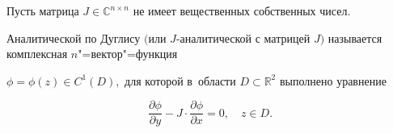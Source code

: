 \begin{definition}[1~\cite{1Nk-S1}]Пусть  матрица $J\in\mathbb{C}^{n\times n}$ не имеет вещественных собственных чисел$.$ 

Аналитической по Дуглису $($или $J$-аналитической с матрицей $J)$ называется   комплексная $n$"=вектор"=функция

 $ \phi= \phi(z)\in C^1(D),$ для которой в~области  $ D\subset\mathbb{R}^2$  выполнено  уравнение

\begin{equation}

\frac{\partial\phi}{\partial y}-J\cdot\frac{\partial\phi}{\partial x}=0,\quad

z\in D.

\label{1n}

\end{equation}

\end{definition}



\smallskip






%



%

%




%




%


